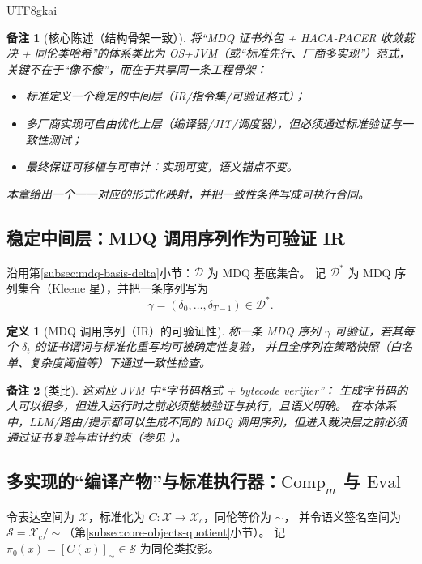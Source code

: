 \documentclass[12pt]{article}
\newtheorem{definition}{定义}[section]
\newtheorem{remark}{备注}[section]
\begin{document}
\begin{CJK*}{UTF8}{gkai}
\begin{remark}[核心陈述（结构骨架一致）]
将“MDQ 证书外包 + HACA-PACER 收敛裁决 + 同伦类哈希”的体系类比为 \textsf{OS+JVM}（或“标准先行、厂商多实现”）范式，
关键不在于“像不像”，而在于共享同一条工程骨架：
\begin{itemize}
  \item 标准定义一个稳定的中间层（IR/指令集/可验证格式）；
  \item 多厂商实现可自由优化上层（编译器/JIT/调度器），但必须通过标准验证与一致性测试；
  \item 最终保证可移植与可审计：实现可变，语义锚点不变。
\end{itemize}
本章给出一个一一对应的形式化映射，并把一致性条件写成可执行合同。
\end{remark}

\subsection{稳定中间层：MDQ 调用序列作为可验证 IR}
\label{subsec:mdq-as-ir}

沿用第\ref{subsec:mdq-basis-delta}小节：$\mathcal{D}$ 为 MDQ 基底集合。
记 $\mathcal{D}^{\ast}$ 为 MDQ 序列集合（Kleene 星），并把一条序列写为
\[
\gamma=(\delta_0,\ldots,\delta_{T-1})\in\mathcal{D}^{\ast}.
\]

\begin{definition}[MDQ 调用序列（IR）的可验证性]
称一条 MDQ 序列 $\gamma$ \emph{可验证}，若其每个 $\delta_t$ 的证书谓词与标准化重写均可被确定性复验，
并且全序列在策略快照（白名单、复杂度阈值等）下通过一致性检查。
\end{definition}

\begin{remark}[类比]
这对应 \textsf{JVM} 中“字节码格式 + bytecode verifier”：
生成字节码的人可以很多，但进入运行时之前必须能被验证与执行，且语义明确。
在本体系中，LLM/路由/提示都可以生成不同的 MDQ 调用序列，但进入裁决层之前必须通过证书复验与审计约束（参见 \cite{jvms}）。
\end{remark}

\subsection{多实现的“编译产物”与标准执行器：\texorpdfstring{$\mathrm{Comp}_m$}{Comp_m} 与 \texorpdfstring{$\mathrm{Eval}$}{Eval}}
\label{subsec:comp-eval-contract}

令表达空间为 $\mathcal{X}$，标准化为 $C:\mathcal{X}\to\mathcal{X}_c$，同伦等价为 $\sim$，
并令语义签名空间为 $\mathcal{S}=\mathcal{X}_c/\sim$（第\ref{subsec:core-objects-quotient}小节）。
记 $\pi_0(x)=[C(x)]_{\sim}\in\mathcal{S}$ 为同伦类投影。


\end{CJK*}
\end{document}
